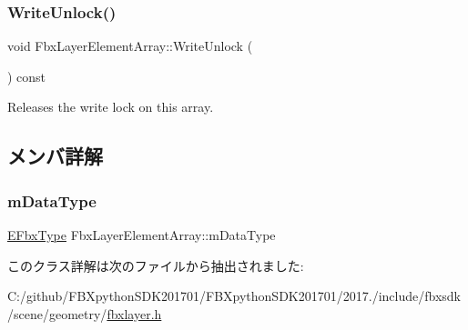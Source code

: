 \subsubsection{\texorpdfstring{Write\+Unlock()}{WriteUnlock()}}
{\footnotesize\ttfamily void Fbx\+Layer\+Element\+Array\+::\+Write\+Unlock (\begin{DoxyParamCaption}{ }\end{DoxyParamCaption}) const}

Releases the write lock on this array. 

\subsection{メンバ詳解}
\mbox{\label{class_fbx_layer_element_array_a47930d23e0f3e596bee667ffe900268b}} 
\subsubsection{\texorpdfstring{m\+Data\+Type}{mDataType}}
{\footnotesize\ttfamily \hyperlink{fbxpropertytypes_8h_a73913a5ddfb20e57c6f25e9e6784bd92}{E\+Fbx\+Type} Fbx\+Layer\+Element\+Array\+::m\+Data\+Type\hspace{0.3cm}{\ttfamily [protected]}}



このクラス詳解は次のファイルから抽出されました\+:\begin{DoxyCompactItemize}
\item 
C\+:/github/\+F\+B\+Xpython\+S\+D\+K201701/\+F\+B\+Xpython\+S\+D\+K201701/2017./include/fbxsdk/scene/geometry/\hyperlink{fbxlayer_8h}{fbxlayer.\+h}\end{DoxyCompactItemize}
